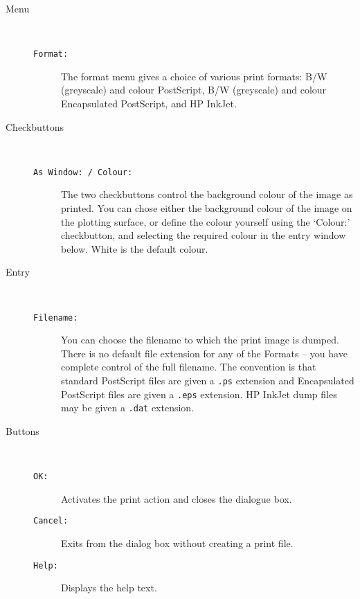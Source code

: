 \documentclass[twoside,11pt,nolof]{starlink}
\begin{document}
\begin{description}

\item[Menu]~

\begin{description}

\item[{\texttt{Format:}}] The format menu gives a choice of various print
formats: B/W (greyscale) and colour PostScript,  B/W (greyscale) and colour
Encapsulated PostScript, and HP InkJet.

\end{description}

\item[Checkbuttons]~

\begin{description}

\item[{\texttt{As Window: / Colour:}}] The two checkbuttons control the
background colour of the image as printed.  You can chose either the
background colour of the image on the plotting surface, or define the
colour yourself using the `Colour:' checkbutton, and selecting the
required colour in the entry window below.  White is the default
colour.

\end{description}

\item[Entry]~

\begin{description}

\item[{\texttt{Filename:}}] You can choose the filename to which the print
image is dumped.  There is no default file extension for any of the
Formats -- you have complete control of the full filename.  The
convention is that standard PostScript files are given a {\texttt{.ps}}
extension and Encapsulated PostScript files are given a {\texttt{.eps}}
extension.  HP InkJet dump files may be given a {\texttt{.dat}} extension.

\end{description}

\item[Buttons]~

\begin{description}

\item[{\texttt{OK:}}] Activates the print action and closes the {} dialogue box.

\item[{\texttt{Cancel:}}] Exits from the {} dialog box
without creating a print file.

\item[{\texttt{Help:}}] Displays the help text.

\end{description}

\end{description}
\end{document}
